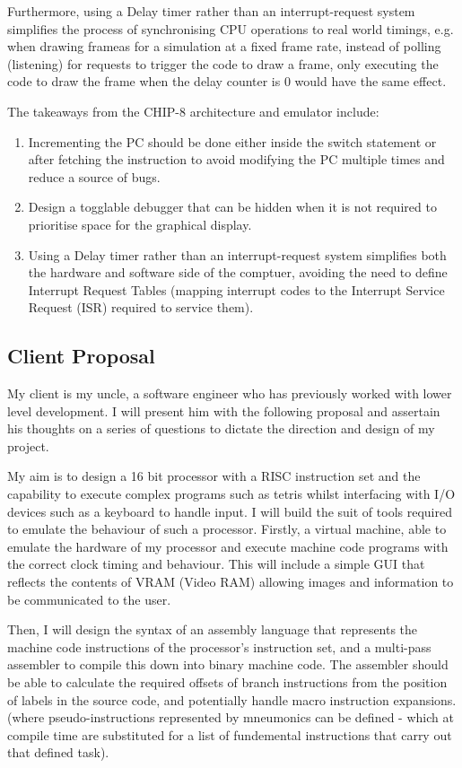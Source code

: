 Furthermore, using a Delay timer rather than an interrupt-request system simplifies the process of synchronising CPU operations to real world timings, e.g. when drawing frameas for a simulation at a fixed frame rate, instead of polling (listening) for requests to trigger the code to draw a frame, only executing the code to draw the frame when the delay counter is 0 would have the same effect.

The takeaways from the CHIP-8 architecture and emulator include:
\begin{enumerate}
    \item Incrementing the PC should be done either inside the switch statement or after fetching the instruction to avoid modifying the PC multiple times and reduce a source of bugs.
    \item Design a togglable debugger that can be hidden when it is not required to prioritise space for the graphical display.
    \item Using a Delay timer rather than an interrupt-request system simplifies both the hardware and software side of the comptuer, avoiding the need to define Interrupt Request Tables (mapping interrupt codes to the Interrupt Service Request (ISR) required to service them).
\end{enumerate}

\subsection{Client Proposal}
My client is my uncle, a software engineer who has previously worked with lower level development. I will present him with the following proposal and assertain his thoughts on a series of questions to dictate the direction and design of my project.

My aim is to design a 16 bit processor with a RISC instruction set and the capability to execute complex programs such as tetris whilst interfacing with I/O devices such as a keyboard to handle input. I will build the suit of tools required to emulate the behaviour of such a processor. Firstly, a virtual machine, able to emulate the hardware of my processor and execute machine code programs with the correct clock timing and behaviour. This will include a simple GUI that reflects the contents of VRAM (Video RAM) allowing images and information to be communicated to the user.

Then, I will design the syntax of an assembly language that represents the machine code instructions of the processor's instruction set, and a multi-pass assembler to compile this down into binary machine code. The assembler should be able to calculate the required offsets of branch instructions from the position of labels in the source code, and potentially handle macro instruction expansions. (where pseudo-instructions represented by mneumonics can be defined - which at compile time are substituted for a list of fundemental instructions that carry out that defined task).

